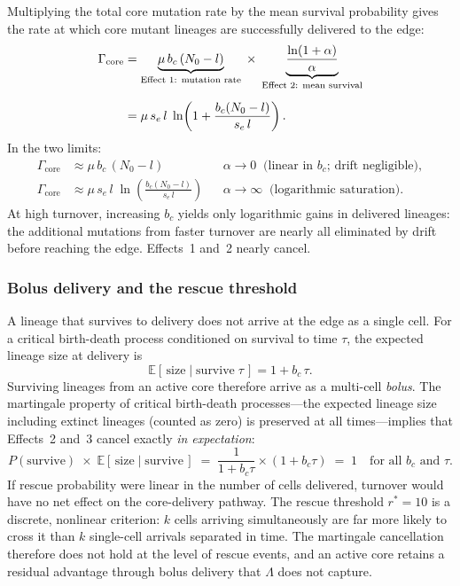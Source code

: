 \documentclass[12pt]{article}
\newcommand{\Nzero}{N_0}
\newcommand{\sEdge}{s_e}
\newcommand{\bCore}{b_c}
\begin{document}
Multiplying the total core mutation rate by the mean survival probability
gives the rate at which core mutant lineages are successfully delivered
to the edge:
\begin{align}
    \Gamma_{\text{core}}
    &= \underbrace{\mu\,\bCore\,(\Nzero - l)}_{\text{Effect 1: mutation rate}}
       \;\times\;
       \underbrace{\frac{\ln(1+\alpha)}{\alpha}}_{\text{Effect 2: mean survival}}
    \notag \\[6pt]
    &= \mu\,\sEdge\,l\;\ln\!\left(1 + \frac{\bCore(\Nzero-l)}{\sEdge\,l}\right).
    \label{eq:core_delivery_rate}
\end{align}
In the two limits:
\begin{align}
    \Gamma_{\text{core}} &\approx \mu\,\bCore\,(\Nzero - l)
        && \alpha \to 0
           \;\;\text{(linear in }\bCore\text{; drift negligible)},
        \label{eq:gamma_dormant}\\[4pt]
    \Gamma_{\text{core}} &\approx \mu\,\sEdge\,l\;\ln\!\!\left(
        \frac{\bCore(\Nzero-l)}{\sEdge\,l}\right)
        && \alpha \to \infty
           \;\;\text{(logarithmic saturation)}.
        \label{eq:gamma_active}
\end{align}
At high turnover, increasing $\bCore$ yields only logarithmic gains in
delivered lineages: the additional mutations from faster turnover are
nearly all eliminated by drift before reaching the edge. Effects~1 and~2
nearly cancel.

\subsubsection*{Bolus delivery and the rescue threshold}

A lineage that survives to delivery does not arrive at the edge as a
single cell. For a critical birth-death process conditioned on survival
to time $\tau$, the expected lineage size at delivery is \cite{athreya1972}
\begin{equation}
    \mathbb{E}[\,\text{size} \mid \text{survive}\;\tau\,] = 1 + \bCore\,\tau.
    \label{eq:bolus_size}
\end{equation}
Surviving lineages from an active core therefore arrive as a multi-cell
\emph{bolus}. The martingale property of critical birth-death processes---the
expected lineage size including extinct lineages (counted as zero) is
preserved at all times---implies that Effects~2 and~3 cancel exactly
\emph{in expectation}:
\begin{equation}
    P(\text{survive}) \;\times\; \mathbb{E}[\,\text{size} \mid \text{survive}\,]
    \;=\;
    \frac{1}{1+\bCore\tau}\times(1+\bCore\tau) \;=\; 1
    \quad \text{for all }\bCore\text{ and }\tau.
    \label{eq:martingale}
\end{equation}
If rescue probability were linear in the number of cells delivered, turnover
would have no net effect on the core-delivery pathway. The rescue threshold
$r^{*} = 10$ is a discrete, nonlinear criterion: $k$ cells arriving
simultaneously are far more likely to cross it than $k$ single-cell arrivals
separated in time. The martingale cancellation therefore does not hold at
the level of rescue events, and an active core retains a residual advantage
through bolus delivery that $\Lambda$ does not capture.
\end{document}
